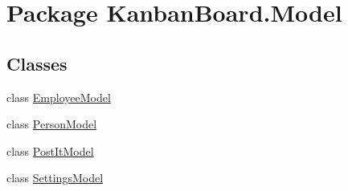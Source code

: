 \hypertarget{namespace_kanban_board_1_1_model}{}\section{Package Kanban\+Board.\+Model}
\label{namespace_kanban_board_1_1_model}
\subsection*{Classes}
\begin{DoxyCompactItemize}
\item 
class \hyperlink{class_kanban_board_1_1_model_1_1_employee_model}{Employee\+Model}
\item 
class \hyperlink{class_kanban_board_1_1_model_1_1_person_model}{Person\+Model}
\item 
class \hyperlink{class_kanban_board_1_1_model_1_1_post_it_model}{Post\+It\+Model}
\item 
class \hyperlink{class_kanban_board_1_1_model_1_1_settings_model}{Settings\+Model}
\end{DoxyCompactItemize}
